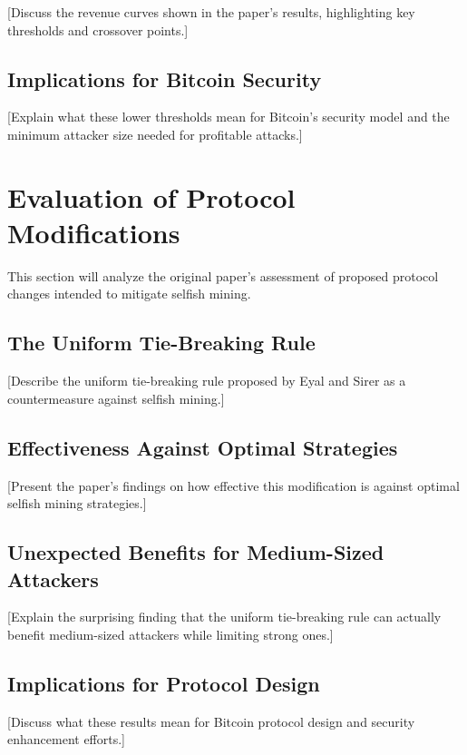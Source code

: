\documentclass[conference]{IEEEtran}
\begin{document}
[Discuss the revenue curves shown in the paper's results, highlighting key thresholds and crossover points.]

\subsection{Implications for Bitcoin Security}

[Explain what these lower thresholds mean for Bitcoin's security model and the minimum attacker size needed for profitable attacks.]

\section{Evaluation of Protocol Modifications}

This section will analyze the original paper's assessment of proposed protocol changes intended to mitigate selfish mining.

\subsection{The Uniform Tie-Breaking Rule}

[Describe the uniform tie-breaking rule proposed by Eyal and Sirer as a countermeasure against selfish mining.]

\subsection{Effectiveness Against Optimal Strategies}

[Present the paper's findings on how effective this modification is against optimal selfish mining strategies.]

\subsection{Unexpected Benefits for Medium-Sized Attackers}

[Explain the surprising finding that the uniform tie-breaking rule can actually benefit medium-sized attackers while limiting strong ones.]

\subsection{Implications for Protocol Design}

[Discuss what these results mean for Bitcoin protocol design and security enhancement efforts.]
\end{document}
